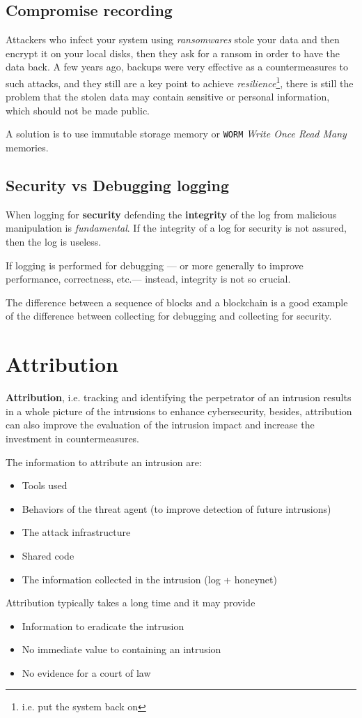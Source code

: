 \subsection{Compromise recording}
Attackers who infect your system using \textit{ransomwares} stole your data and then encrypt it on your local disks,
then they ask for a ransom in order to have the data back.
A few years ago,
backups were very effective as a countermeasures to such attacks,
and they still are a key point to achieve \textit{resilience}\footnote{i.e. put the system back on},
there is still the problem that the stolen data may contain sensitive or personal information,
which should not be made public.

A solution is to use immutable storage memory or \texttt{WORM} \textit{Write Once Read Many} memories.

\subsection{Security vs Debugging logging}
When logging for \textbf{security} defending the \textbf{integrity} of the log
from malicious manipulation is \textit{fundamental}.
If the integrity of a log for security is not assured, then the log is useless.

If logging is performed for debugging {---} or more generally to improve performance, correctness, etc.{---} instead,
integrity is not so crucial. 

The difference between a sequence of blocks and a blockchain is a good example of the difference between collecting for debugging and collecting for security.

\section{Attribution}
\textbf{Attribution}, i.e. tracking and identifying the perpetrator of an intrusion results in a
whole picture of the intrusions to enhance cybersecurity,
besides,
attribution can also improve the evaluation of the intrusion impact and
increase the investment in countermeasures.

The information to attribute an intrusion are:
\begin{itemize}
   \item Tools used
   \item Behaviors of the threat agent (to improve detection of future intrusions)
   \item The attack infrastructure
   \item Shared code
   \item The information collected in the intrusion (log + honeynet)
\end{itemize}
Attribution typically takes a long time and it may provide
\begin{itemize}
   \item Information to eradicate the intrusion
   \item No immediate value to containing an intrusion
   \item No evidence for a court of law
\end{itemize}